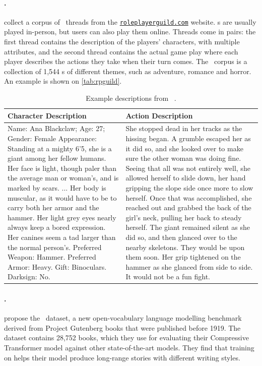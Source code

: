 \paragraph{\rpguild.}
\citet{louis2018deep} collect a corpus of \rpg\ threads from the \href{https://roleplayerguild.com}{\texttt{roleplayerguild.com}} website. {\rpg}s are usually played in-person, but users can also play them online. Threads come in pairs: the first thread contains the description of the players' characters, with multiple attributes, and the second thread contains the actual game play where each player describes the actions they take when their turn comes. The \rpguild\ corpus is a collection of 1,544 {\rpg}s of different themes, such as adventure, romance and horror. An example is shown on \autoref{tab:rpguild}.

\begin{table}[h!]
\small
\centering
\begin{tabular}{p{}p{}}
\toprule
    \textbf{Character Description} & \textbf{Action Description} \\
\midrule
    Name: Ana Blackclaw; Age: 27; Gender: Female Appearance: Standing at a mighty 6’5, she is a giant among her fellow humans. Her face is light, though paler than the average man or woman’s, and is marked by scars. ... Her body is muscular, as it would have to be to carry both her armor and the hammer. Her light grey eyes nearly always keep a bored expression. Her canines seem a tad larger than the normal person’s. Preferred Weapon: Hammer. Preferred Armor: Heavy. Gift: Binoculars. Darksign: No. & She stopped dead in her tracks as the hissing began. A grumble escaped her as it did so, and she looked over to make sure the other woman was doing fine. Seeing that all was not entirely well, she allowed herself to slide down, her hand gripping the slope side once more to slow herself. Once that was accomplished, she reached out and grabbed the back of the girl’s neck, pulling her back to steady herself. The giant remained silent as she did so, and then glanced over to the nearby skeletons. They would be upon them soon. Her grip tightened on the hammer as she glanced from side to side. It would not be a fun fight. \\
\bottomrule
\end{tabular}
\caption{Example descriptions from \rpguild\ \citep{louis2018deep}.}
\label{tab:rpguild}
\end{table}

\paragraph{\pgnt.}
\citet{rae2019compressive} propose the \pgnt\ dataset, a new open-vocabulary language modelling benchmark derived from Project Gutenberg books that were published before 1919. The {\pgnt} dataset contains 28,752 books, which they use for evaluating their Compressive Transformer model against other state-of-the-art models. They find that training on {\pgnt} helps their model produce long-range stories with different writing styles.

